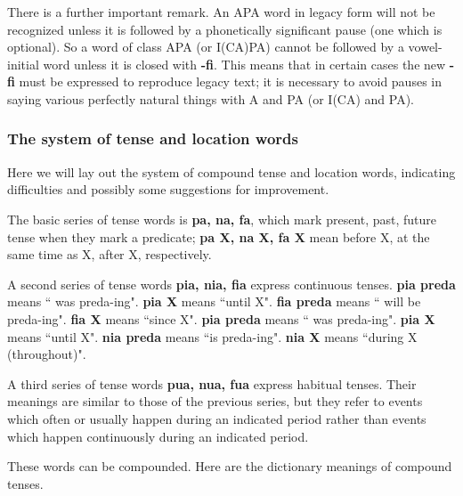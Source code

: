 \documentclass[12pt]{book}
\begin{document}
There is a further important remark.  An APA word in legacy form will not be recognized unless it is followed by a phonetically significant pause (one which is optional).  So a word of class APA (or I(CA)PA) cannot be followed by a vowel-initial word unless it is closed with {\bf -fi}.  This means that in certain cases the new {\bf -fi} must be expressed to reproduce legacy text;  it is necessary to avoid pauses in saying various perfectly natural things with A and PA (or I(CA) and PA).

\subsubsection{The system of tense and location words}

Here we will lay out the system of compound tense and location words, indicating difficulties and possibly some suggestions for improvement.

The basic series of tense words is {\bf pa, na, fa}, which mark present, past, future tense when they mark a predicate; {\bf pa X, na X, fa X} mean before X, at the same time as X,
after X, respectively.

A second series of tense words {\bf pia, nia, fia}  express continuous tenses.   {\bf pia preda} means `` was preda-ing".   {\bf pia X} means ``until X".   {\bf fia preda} means `` will be preda-ing".   {\bf fia X} means ``since X".   {\bf pia preda} means `` was preda-ing".   {\bf pia X} means ``until X".   {\bf nia preda} means ``is preda-ing".   {\bf nia X} means ``during X (throughout)".

A third series of tense words {\bf pua, nua, fua}  express habitual tenses.   Their meanings are similar to those of the previous series, but they refer to events which often or usually
happen during an indicated period rather than events which happen continuously during an indicated period.

These words can be compounded.  Here are the dictionary meanings of compound tenses.
\end{document}

